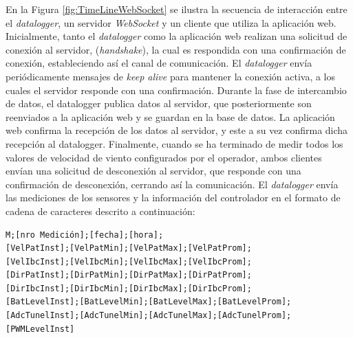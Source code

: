 En la Figura \ref{fig:TimeLineWebSocket} se ilustra la secuencia de interacción entre el \textit{datalogger}, un servidor \textit{WebSocket} y un cliente que utiliza la  aplicación web. Inicialmente, tanto el \textit{datalogger} como la aplicación web realizan una solicitud de conexión al servidor, (\textit{handshake}), la cual es respondida con una confirmación de conexión, estableciendo así el canal de comunicación. El \textit{datalogger} envía periódicamente mensajes de \textit{keep alive} para mantener la conexión activa, a los cuales el servidor responde con una confirmación. Durante la fase de intercambio de datos, el datalogger publica datos al servidor, que posteriormente son reenviados a la aplicación web y se guardan en la base de datos. La aplicación web confirma la recepción de los datos al servidor, y este a su vez confirma dicha recepción al datalogger. Finalmente, cuando se ha terminado de medir todos los valores de velocidad de viento configurados por el operador, ambos clientes envían una solicitud de desconexión al servidor, que responde con una confirmación de desconexión, cerrando así la comunicación. El \textit{datalogger} envía las mediciones de los sensores y la información del controlador en el formato de cadena de caracteres descrito a continuación:

\begin{verbatim}
M;[nro Medición];[fecha];[hora];
[VelPatInst];[VelPatMin];[VelPatMax];[VelPatProm];
[VelIbcInst];[VelIbcMin];[VelIbcMax];[VelIbcProm];
[DirPatInst];[DirPatMin];[DirPatMax];[DirPatProm];
[DirIbcInst];[DirIbcMin];[DirIbcMax];[DirIbcProm];
[BatLevelInst];[BatLevelMin];[BatLevelMax];[BatLevelProm];
[AdcTunelInst];[AdcTunelMin];[AdcTunelMax];[AdcTunelProm];
[PWMLevelInst]
\end{verbatim}





